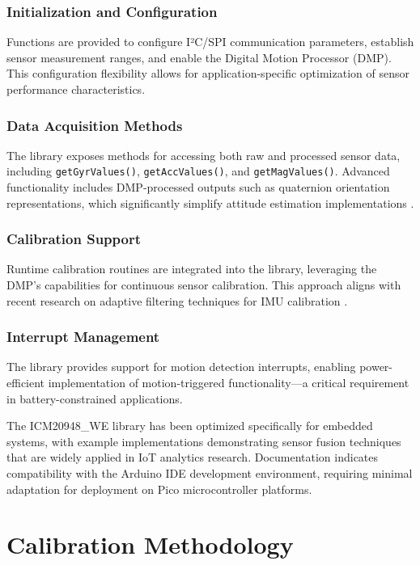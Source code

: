 \subsubsection{Initialization and Configuration}
Functions are provided to configure I²C/SPI communication parameters, establish sensor measurement ranges, and enable the Digital Motion Processor (DMP). This configuration flexibility allows for application-specific optimization of sensor performance characteristics.

\subsubsection{Data Acquisition Methods}
The library exposes methods for accessing both raw and processed sensor data, including \texttt{getGyrValues()}, \texttt{getAccValues()}, and \texttt{getMagValues()}. Advanced functionality includes DMP-processed outputs such as quaternion orientation representations, which significantly simplify attitude estimation implementations \cite{Wen:2014}.

\subsubsection{Calibration Support}
Runtime calibration routines are integrated into the library, leveraging the DMP's capabilities for continuous sensor calibration. This approach aligns with recent research on adaptive filtering techniques for IMU calibration \cite{Bistrov:2012}.

\subsubsection{Interrupt Management}
The library provides support for motion detection interrupts, enabling power-efficient implementation of motion-triggered functionality—a critical requirement in battery-constrained applications.

The ICM20948\_WE library has been optimized specifically for embedded systems, with example implementations demonstrating sensor fusion techniques that are widely applied in IoT analytics research. Documentation indicates compatibility with the Arduino IDE development environment, requiring minimal adaptation for deployment on Pico microcontroller platforms.

\section{Calibration Methodology}

